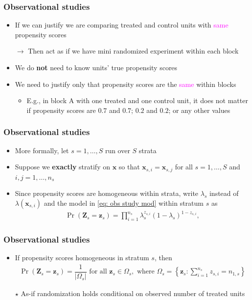 \documentclass[table, xcolor = {dvipsnames}, 9pt]{beamer}
\theoremstyle{plain}
\begin{document}
\begin{frame}[t]
\frametitle{Observational studies}
\vfill
\begin{itemize} \vfill
\item If we can justify we are comparing treated and control units with \textcolor{magenta}{same} propensity scores \vfill
\item[] $\rightarrow$ Then act as if we have mini randomized experiment within each block \vfill
\item We do \textbf{not} need to know units' true propensity scores \vfill
\item We need to justify only that propensity scores are the \textcolor{magenta}{same} within blocks \vfill
\begin{itemize} \vfill
\item E.g., in block A with one treated and one control unit, it does not matter if propensity scores are $0.7$ and $0.7$; $0.2$ and $0.2$; or any other values \vfill
\end{itemize} \vfill
\end{itemize} \vfill
\end{frame}
\begin{frame}[t]
\frametitle{Observational studies}
\vfill
\begin{itemize} \vfill
\item More formally, let $s = 1, \ldots , S$ run over $S$ strata \vfill
\item Suppose we \textbf{exactly} stratify on $\bm{x}$ so that $\bm{x}_{s,i} = \bm{x}_{s,j}$ for all $s = 1, \ldots , S$ and $i,j = 1, \ldots , n_s$ \vfill
\item Since propensity scores are homogeneous within strata, write $\lambda_s$ instead of $\lambda(\bm{x}_{s,i})$ and the model in \eqref{eq: obs study mod} within stratum $s$ as \vfill
\begin{align*}
\Pr\left(\bm{Z}_s = \bm{z}_s\right) = \prod \limits_{i = 1}^{n_s} \lambda_s^{z_{s,i}} (1 - \lambda_s)^{1 - z_{s,i}},
\end{align*} \vfill
\end{itemize} \vfill
\end{frame}
\begin{frame}[t]
\frametitle{Observational studies}
\vfill
\begin{itemize} \vfill
\item If propensity scores homogeneous in stratum $s$, then \vfill 
\begin{align*}
\Pr\left(\bm{Z}_s = \bm{z}_s\right) = \dfrac{1}{\left\lvert \Omega_s \right\rvert} \text{ for all } \bm{z}_s \in \Omega_s, \text{ where } \Omega_s = \left\{\bm{z}_s: \sum \limits_{i = 1}^{n_s} z_{s,i} = n_{1,s}\right\}
\end{align*} \vfill
\item[$\star$] As-if randomization holds conditional on observed number of treated units \vfill
\end{itemize} \vfill
\end{frame}
\end{document}
